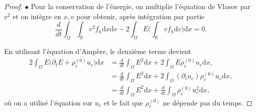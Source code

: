 \begin{proof}
%
  \medskip

  \noindent $\bullet$
  Pour la conservation de l'énergie, on multiplie l'équation de Vlasov par $v^2$ et on intègre en $x,v$ pour obtenir, après intégration par partie
  $$  
    \frac{d}{dt} \int_\Omega\int_{\mathbb{R}} v^2 f_h \mathrm{d}x \mathrm{d}v - 2 \int_\Omega E \Big(\int_{\mathbb{R}} v f_h \mathrm{d}v\Big)\mathrm{d}x = 0.
  $$
  
  En utilisant l'équation d'Ampère, le deuxième terme devient 
  $$
    \begin{aligned}
      2 \int_\Omega E \Big( \partial_t E + \rho^{(0)}_c u_c\Big)\mathrm{d}x
        &=  \frac{d}{dt} \int_\Omega E^2\mathrm{d}x  +2 \int_\Omega E \rho^{(0)}_c u_c \mathrm{d}x, \\
        &= \frac{d}{dt} \int_\Omega E^2\mathrm{d}x  + 2\int_\Omega (\partial_t u_c ) \rho^{(0)}_c u_c \mathrm{d}x, \\ 
        &= \frac{d}{dt} \int_\Omega E^2\mathrm{d}x  + \frac{d}{dt} \int_\Omega \rho_c^{(0)} u_c^2 \mathrm{d}x, 
    \end{aligned}
  $$
  où on a utilisé l'équation sur $u_c$ et le fait que $\rho_c^{(0)}$ ne dépende pas du temps. 
\end{proof}
